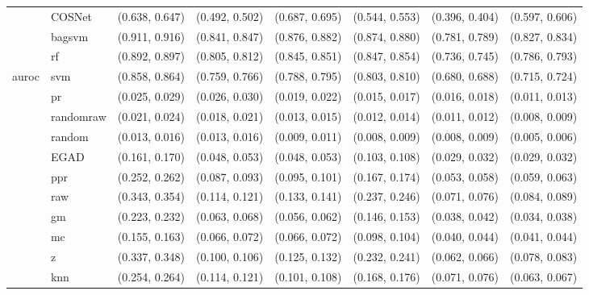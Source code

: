 \begin{table}[H]
{\begin{tabular}{llllllll}
 & COSNet & (0.638, 0.647) & (0.492, 0.502) & (0.687, 0.695) & (0.544, 0.553) & (0.396, 0.404) & (0.597, 0.606)\\

 & bagsvm & (0.911, 0.916) & (0.841, 0.847) & (0.876, 0.882) & (0.874, 0.880) & (0.781, 0.789) & (0.827, 0.834)\\

 & rf & (0.892, 0.897) & (0.805, 0.812) & (0.845, 0.851) & (0.847, 0.854) & (0.736, 0.745) & (0.786, 0.793)\\

\multirow{-15}{*}{\raggedright\arraybackslash auroc} & svm & (0.858, 0.864) & (0.759, 0.766) & (0.788, 0.795) & (0.803, 0.810) & (0.680, 0.688) & (0.715, 0.724)\\
\cmidrule{1-8}
 & pr & (0.025, 0.029) & (0.026, 0.030) & (0.019, 0.022) & (0.015, 0.017) & (0.016, 0.018) & (0.011, 0.013)\\

 & randomraw & (0.021, 0.024) & (0.018, 0.021) & (0.013, 0.015) & (0.012, 0.014) & (0.011, 0.012) & (0.008, 0.009)\\

 & random & (0.013, 0.016) & (0.013, 0.016) & (0.009, 0.011) & (0.008, 0.009) & (0.008, 0.009) & (0.005, 0.006)\\

 & EGAD & (0.161, 0.170) & (0.048, 0.053) & (0.048, 0.053) & (0.103, 0.108) & (0.029, 0.032) & (0.029, 0.032)\\

 & ppr & (0.252, 0.262) & (0.087, 0.093) & (0.095, 0.101) & (0.167, 0.174) & (0.053, 0.058) & (0.059, 0.063)\\

 & raw & (0.343, 0.354) & (0.114, 0.121) & (0.133, 0.141) & (0.237, 0.246) & (0.071, 0.076) & (0.084, 0.089)\\

 & gm & (0.223, 0.232) & (0.063, 0.068) & (0.056, 0.062) & (0.146, 0.153) & (0.038, 0.042) & (0.034, 0.038)\\

 & mc & (0.155, 0.163) & (0.066, 0.072) & (0.066, 0.072) & (0.098, 0.104) & (0.040, 0.044) & (0.041, 0.044)\\

 & z & (0.337, 0.348) & (0.100, 0.106) & (0.125, 0.132) & (0.232, 0.241) & (0.062, 0.066) & (0.078, 0.083)\\

 & knn & (0.254, 0.264) & (0.114, 0.121) & (0.101, 0.108) & (0.168, 0.176) & (0.071, 0.076) & (0.063, 0.067)\\


\end{tabular}}
\end{table}
